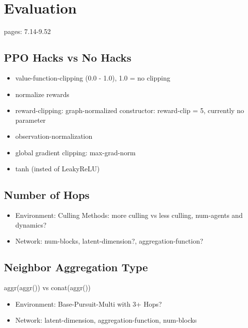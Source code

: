
\chapter{Evaluation}
pages: 7.14-9.52
\section{PPO Hacks vs No Hacks}
\begin{itemize}[noitemsep,nolistsep]
    \item value-function-clipping (0.0 - 1.0), 1.0 = no clipping
    \item normalize rewards
    \item reward-clipping: graph-normalized constructor: reward-clip = 5, currently no parameter
    \item observation-normalization
    \item global gradient clipping: max-grad-norm
    \item tanh (insted of LeakyReLU)
\end{itemize}

\section{Number of Hops}
\begin{itemize}[noitemsep,nolistsep]
    \item Environment: Culling Methods: more culling vs less culling, num-agents and dynamics?
    \item Network: num-blocks, latent-dimension?, aggregation-function?
\end{itemize}

\section{Neighbor Aggregation Type}
aggr(aggr()) vs conat(aggr())
\begin{itemize}[noitemsep,nolistsep]
    \item Environment: Base-Pursuit-Multi with 3+ Hops?
    \item Network: latent-dimension, aggregation-function, num-blocks
\end{itemize}

